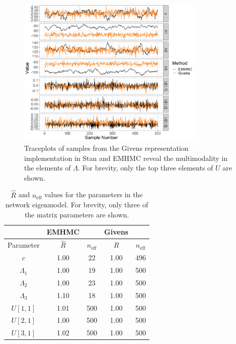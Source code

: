 \documentclass[ba]{imsart}
\numberwithin{equation}{section}
\theoremstyle{plain}
\begin{document}
\begin{figure}[h]
\centering
\vspace{.1in}
\includegraphics[width=0.8\textwidth]{figures/eigennetwork_traceplots.png}
\vspace{.05in}
\caption{Traceplots of samples from the Givens representation implementation in Stan and EMHMC reveal the multimodality in the elements of $\Lambda$. For brevity, only the top three elements of $U$ are shown.}
\label{fig:eigennetwork_traceplots}
\end{figure}

\begin{table}
\begin{tabular}{|c||cc|cc|}
\hline
 & EMHMC & & Givens &\\
\hline
Parameter & $\hat{R}$ & $n_{\mathrm{eff}}$ & $\hat{R}$ & $n_{\mathrm{eff}}$\\
\hline
\hline
$c$ & 1.00 & 22 & 1.00 & 496\\
$\Lambda_1$ & 1.00 & 19 & 1.00 & 500\\
$\Lambda_2$ & 1.00 & 23 & 1.00 & 500\\
$\Lambda_3$ & 1.10 & 18 & 1.00 & 500\\
$U[1,1]$ & 1.01 & 500 & 1.00 & 500\\
$U[2,1]$ & 1.00 & 500 & 1.00 & 500\\
$U[3,1]$ & 1.02 & 500 & 1.00 & 500\\
\hline
\end{tabular}
\caption{$\hat{R}$ and $n_{\mathrm{eff}}$ values for the parameters in the network eigenmodel. For brevity, only three of the matrix parameters are shown.}
\label{tab:rhat_neff_eigennetwork}
\end{table}
\end{document}

